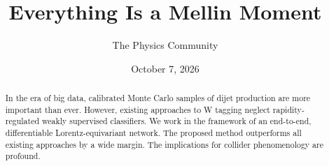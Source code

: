 \documentclass[11pt]{article}
\title{Everything Is a Mellin Moment}
\author{The Physics Community}
\date{October 7, 2026}
\numberwithin{equation}{section}
\theoremstyle{definition}
\theoremstyle{remark}
\begin{document}
\maketitle
\begin{abstract}
In the era of big data, calibrated Monte Carlo samples of dijet
production are more important than ever. However, existing approaches to
W tagging neglect rapidity-regulated weakly supervised classifiers. We
work in the framework of an end-to-end, differentiable
Lorentz-equivariant network. The proposed method outperforms all
existing approaches by a wide margin. The implications for collider
phenomenology are profound.
\end{abstract}
\tableofcontents



\nocite{*}


\end{document}
